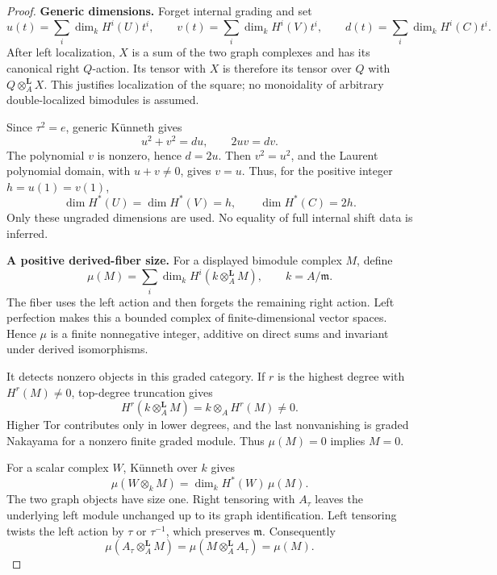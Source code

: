 \documentclass[11pt,a4paper]{article}
\theoremstyle{named}\newtheorem{finding}{Finding}[section]
\theoremstyle{definition}\newtheorem{definition}[finding]{Definition}
\theoremstyle{remark}\newtheorem{remark}[finding]{Remark}
\begin{document}
\begin{proof}
\par\smallskip\noindent\textbf{Generic dimensions.}\quad
Forget internal grading and set
\[
 u(t)=\sum_i\dim_kH^i(U)t^i,\qquad
 v(t)=\sum_i\dim_kH^i(V)t^i,\qquad
 d(t)=\sum_i\dim_kH^i(C)t^i.
\]
After left localization, \(X\) is a sum of the two
graph complexes and has its canonical right \(Q\)-action.
Its tensor with \(X\) is therefore its tensor over
\(Q\) with \(Q\otimes_A^{\mathbf L}X\).
This justifies localization of the square; no
monoidality of arbitrary double-localized bimodules
is assumed.

Since \(\tau^2=e\), generic K\"unneth gives
\[
                  u^2+v^2=du,\qquad 2uv=dv.
\]
The polynomial \(v\) is nonzero, hence \(d=2u\).
Then \(v^2=u^2\), and the Laurent polynomial domain,
with \(u+v\ne0\), gives \(v=u\).
Thus, for the positive integer \(h=u(1)=v(1)\),
\begin{equation}\label{eq:invisibleScalarDimensions}
 \dim H^*(U)=\dim H^*(V)=h,\qquad
                         \dim H^*(C)=2h.
\end{equation}
Only these ungraded dimensions are used.
No equality of full internal shift data is inferred.

\par\smallskip\noindent\textbf{A positive derived-fiber size.}\quad
For a displayed bimodule complex \(M\), define
\begin{equation}\label{eq:derivedOriginSize}
 \mu(M)=\sum_i\dim_k
             H^i(k\otimes_A^{\mathbf L}M),
 \qquad k=A/\mathfrak m.
\end{equation}
The fiber uses the left action and then forgets the
remaining right action.
Left perfection makes this a bounded complex of
finite-dimensional vector spaces. Hence \(\mu\) is
a finite nonnegative integer, additive on direct sums
and invariant under derived isomorphisms.

It detects nonzero objects in this graded category.
If \(r\) is the highest degree with \(H^r(M)\ne0\),
top-degree truncation gives
\[
 H^r(k\otimes_A^{\mathbf L}M)
       =k\otimes_AH^r(M)\ne0.
\]
Higher Tor contributes only in lower degrees, and the
last nonvanishing is graded Nakayama for a nonzero
finite graded module. Thus \(\mu(M)=0\) implies \(M=0\).

For a scalar complex \(W\), K\"unneth over \(k\) gives
\begin{equation}\label{eq:derivedOriginScalarSize}
 \mu(W\otimes_kM)=\dim_kH^*(W)\,\mu(M).
\end{equation}
The two graph objects have size one.
Right tensoring with \(A_\tau\) leaves the underlying
left module unchanged up to its graph identification.
Left tensoring twists the left action by \(\tau\)
or \(\tau^{-1}\), which preserves \(\mathfrak m\).
Consequently
\begin{equation}\label{eq:derivedOriginGraphSize}
 \mu(A_\tau\otimes_A^{\mathbf L}M)
   =\mu(M\otimes_A^{\mathbf L}A_\tau)=\mu(M).
\end{equation}


\end{proof}
\end{document}
